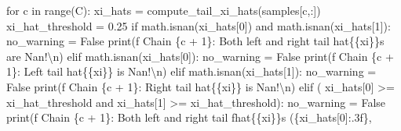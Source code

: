 \documentclass[
  letterpaper,
  DIV=11,
  numbers=noendperiod]{scrartcl}
\newenvironment{Shaded}{\begin{snugshade}}{\end{snugshade}}
\newcommand{\BuiltInTok}[1]{\textcolor[rgb]{0.00,0.23,0.31}{#1}}
\newcommand{\CharTok}[1]{\textcolor[rgb]{0.13,0.47,0.30}{#1}}
\newcommand{\ControlFlowTok}[1]{\textcolor[rgb]{0.00,0.23,0.31}{#1}}
\newcommand{\DecValTok}[1]{\textcolor[rgb]{0.68,0.00,0.00}{#1}}
\newcommand{\FloatTok}[1]{\textcolor[rgb]{0.68,0.00,0.00}{#1}}
\newcommand{\KeywordTok}[1]{\textcolor[rgb]{0.00,0.23,0.31}{#1}}
\newcommand{\NormalTok}[1]{\textcolor[rgb]{0.00,0.23,0.31}{#1}}
\newcommand{\OperatorTok}[1]{\textcolor[rgb]{0.37,0.37,0.37}{#1}}
\newcommand{\SpecialCharTok}[1]{\textcolor[rgb]{0.37,0.37,0.37}{#1}}
\newcommand{\SpecialStringTok}[1]{\textcolor[rgb]{0.13,0.47,0.30}{#1}}
\newcommand{\StringTok}[1]{\textcolor[rgb]{0.13,0.47,0.30}{#1}}
\newcommand{\VariableTok}[1]{\textcolor[rgb]{0.07,0.07,0.07}{#1}}
\begin{document}
\begin{Shaded}
\begin{Highlighting}[]
  \ControlFlowTok{for}\NormalTok{ c }\KeywordTok{in} \BuiltInTok{range}\NormalTok{(C):}
\NormalTok{    xi\_hats }\OperatorTok{=}\NormalTok{ compute\_tail\_xi\_hats(samples[c,:])}
\NormalTok{    xi\_hat\_threshold }\OperatorTok{=} \FloatTok{0.25}
    \ControlFlowTok{if}\NormalTok{ math.isnan(xi\_hats[}\DecValTok{0}\NormalTok{]) }\KeywordTok{and}\NormalTok{ math.isnan(xi\_hats[}\DecValTok{1}\NormalTok{]):}
\NormalTok{      no\_warning }\OperatorTok{=} \VariableTok{False}
      \BuiltInTok{print}\NormalTok{(}\SpecialStringTok{f\textquotesingle{}  Chain }\SpecialCharTok{\{}\NormalTok{c }\OperatorTok{+} \DecValTok{1}\SpecialCharTok{\}}\SpecialStringTok{: Both left and right tail \textquotesingle{}}
            \StringTok{\textquotesingle{}hat}\SpecialCharTok{\{\{}\StringTok{xi}\SpecialCharTok{\}\}}\StringTok{s are Nan!}\CharTok{\textbackslash{}n}\StringTok{\textquotesingle{}}\NormalTok{)}
    \ControlFlowTok{elif}\NormalTok{ math.isnan(xi\_hats[}\DecValTok{0}\NormalTok{]):}
\NormalTok{      no\_warning }\OperatorTok{=} \VariableTok{False}
      \BuiltInTok{print}\NormalTok{(}\SpecialStringTok{f\textquotesingle{}  Chain }\SpecialCharTok{\{}\NormalTok{c }\OperatorTok{+} \DecValTok{1}\SpecialCharTok{\}}\SpecialStringTok{: Left tail \textquotesingle{}}
            \StringTok{\textquotesingle{}hat}\SpecialCharTok{\{\{}\StringTok{xi}\SpecialCharTok{\}\}}\StringTok{ is Nan!}\CharTok{\textbackslash{}n}\StringTok{\textquotesingle{}}\NormalTok{)}
    \ControlFlowTok{elif}\NormalTok{ math.isnan(xi\_hats[}\DecValTok{1}\NormalTok{]):}
\NormalTok{      no\_warning }\OperatorTok{=} \VariableTok{False}
      \BuiltInTok{print}\NormalTok{(}\SpecialStringTok{f\textquotesingle{}  Chain }\SpecialCharTok{\{}\NormalTok{c }\OperatorTok{+} \DecValTok{1}\SpecialCharTok{\}}\SpecialStringTok{: Right tail \textquotesingle{}}
            \StringTok{\textquotesingle{}hat}\SpecialCharTok{\{\{}\StringTok{xi}\SpecialCharTok{\}\}}\StringTok{ is Nan!}\CharTok{\textbackslash{}n}\StringTok{\textquotesingle{}}\NormalTok{)}
    \ControlFlowTok{elif}\NormalTok{ (    xi\_hats[}\DecValTok{0}\NormalTok{] }\OperatorTok{\textgreater{}=}\NormalTok{ xi\_hat\_threshold }
         \KeywordTok{and}\NormalTok{ xi\_hats[}\DecValTok{1}\NormalTok{] }\OperatorTok{\textgreater{}=}\NormalTok{ xi\_hat\_threshold):}
\NormalTok{      no\_warning }\OperatorTok{=} \VariableTok{False}
      \BuiltInTok{print}\NormalTok{(}\SpecialStringTok{f\textquotesingle{}  Chain }\SpecialCharTok{\{}\NormalTok{c }\OperatorTok{+} \DecValTok{1}\SpecialCharTok{\}}\SpecialStringTok{: Both left and right tail \textquotesingle{}}
            \SpecialStringTok{f\textquotesingle{}hat}\CharTok{\{\{}\SpecialStringTok{xi}\CharTok{\}\}}\SpecialStringTok{s (}\SpecialCharTok{\{}\NormalTok{xi\_hats[}\DecValTok{0}\NormalTok{]}\SpecialCharTok{:.3f\}}\SpecialStringTok{, \textquotesingle{}}

\end{Highlighting}
\end{Shaded}
\end{document}
